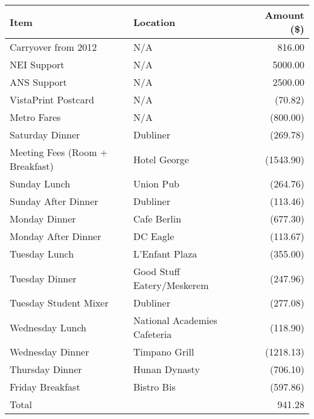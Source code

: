 

\begin{center}
\begin{tabular}{llr}
\toprule
Item                            & Location                     & Amount (\$) \\
\midrule
Carryover from 2012             & N/A                          & 816.00  \\
NEI Support                     & N/A                          & 5000.00 \\
ANS Support                     & N/A                          & 2500.00 \\ 
VistaPrint Postcard             & N/A                          & (70.82) \\
Metro Fares                     & N/A                          & (800.00) \\
Saturday Dinner                 & Dubliner                     & (269.78) \\
Meeting Fees (Room + Breakfast) & Hotel George                 & (1543.90) \\
Sunday Lunch                    & Union Pub                    & (264.76) \\
Sunday After Dinner             & Dubliner                     & (113.46) \\
Monday Dinner                   & Cafe Berlin                  & (677.30) \\
Monday After Dinner             & DC Eagle                     & (113.67) \\
Tuesday Lunch                   & L'Enfant Plaza               & (355.00) \\
Tuesday Dinner                  & Good Stuff Eatery/Meskerem   & (247.96) \\
Tuesday Student Mixer           & Dubliner                     & (277.08) \\
Wednesday Lunch                 & National Academies Cafeteria & (118.90) \\
Wednesday Dinner                & Timpano Grill                & (1218.13) \\
Thursday Dinner                 & Hunan Dynasty                & (706.10) \\
Friday Breakfast                & Bistro Bis                   & (597.86) \\
\bottomrule                
Total                           &                              & 941.28 \footnotemark
\end{tabular}
\end{center}

